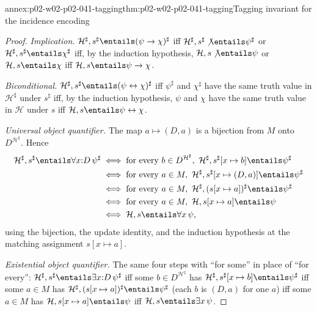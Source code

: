 \begin{annexitem}{annex:p02-w02-p02-041-tagging}{thm:p02-w02-p02-041-tagging}{Tagging invariant for the incidence encoding}
\begin{proof}
\emph{Implication.}  \(\mathcal H^\sharp,s^\sharp\entails(\psi\to\chi)^\sharp\)
iff \(\mathcal H^\sharp,s^\sharp\not\entails\psi^\sharp\) or
\(\mathcal H^\sharp,s^\sharp\entails\chi^\sharp\) iff, by the induction
hypothesis, \(\mathcal H,s\not\entails\psi\) or \(\mathcal H,s\entails\chi\)
iff \(\mathcal H,s\entails\psi\to\chi\).

\emph{Biconditional.}
\(\mathcal H^\sharp,s^\sharp\entails(\psi\leftrightarrow\chi)^\sharp\) iff
\(\psi^\sharp\) and \(\chi^\sharp\) have the same truth value in
\(\mathcal H^\sharp\) under \(s^\sharp\) iff, by the induction hypothesis,
\(\psi\) and \(\chi\) have the same truth value in \(\mathcal H\) under \(s\)
iff \(\mathcal H,s\entails\psi\leftrightarrow\chi\).

\emph{Universal object quantifier.}  The map \(a\mapsto(D,a)\) is a bijection
from \(M\) onto \(D^{\mathcal H^\sharp}\).  Hence
\[
\begin{aligned}
 \mathcal H^\sharp,s^\sharp\entails\forall x{:}D\,\psi^\sharp
 &\iff\text{for every }b\in D^{\mathcal H^\sharp},\
   \mathcal H^\sharp,s^\sharp[x\mapsto b]\entails\psi^\sharp\\
 &\iff\text{for every }a\in M,\
   \mathcal H^\sharp,s^\sharp[x\mapsto(D,a)]\entails\psi^\sharp\\
 &\iff\text{for every }a\in M,\
   \mathcal H^\sharp,(s[x\mapsto a])^\sharp\entails\psi^\sharp\\
 &\iff\text{for every }a\in M,\
   \mathcal H,s[x\mapsto a]\entails\psi\\
 &\iff\mathcal H,s\entails\forall x\,\psi,
\end{aligned}
\]
using the bijection, the update identity, and the induction hypothesis at the
matching assignment \(s[x\mapsto a]\).

\emph{Existential object quantifier.}  The same four steps with ``for some''
in place of ``for every'':
\(\mathcal H^\sharp,s^\sharp\entails\exists x{:}D\,\psi^\sharp\) iff some
\(b\in D^{\mathcal H^\sharp}\) has
\(\mathcal H^\sharp,s^\sharp[x\mapsto b]\entails\psi^\sharp\) iff some
\(a\in M\) has \(\mathcal H^\sharp,(s[x\mapsto a])^\sharp\entails\psi^\sharp\)
(each \(b\) is \((D,a)\) for one \(a\)) iff some \(a\in M\) has
\(\mathcal H,s[x\mapsto a]\entails\psi\) iff \(\mathcal H,s\entails\exists
x\,\psi\).


\end{proof}
\end{annexitem}
